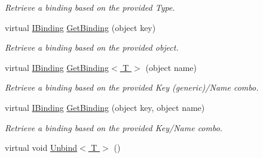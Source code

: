 \begin{DoxyCompactItemize}
\begin{DoxyCompactList}\small\item\em Retrieve a binding based on the provided Type. \end{DoxyCompactList}\item 
\hypertarget{classstrange_1_1framework_1_1impl_1_1_binder_a18a6e363f84b590c2660ba320e5563b9}{virtual \hyperlink{interfacestrange_1_1framework_1_1api_1_1_i_binding}{I\-Binding} \hyperlink{classstrange_1_1framework_1_1impl_1_1_binder_a18a6e363f84b590c2660ba320e5563b9}{Get\-Binding} (object key)}\label{classstrange_1_1framework_1_1impl_1_1_binder_a18a6e363f84b590c2660ba320e5563b9}

\begin{DoxyCompactList}\small\item\em Retrieve a binding based on the provided object. \end{DoxyCompactList}\item 
\hypertarget{classstrange_1_1framework_1_1impl_1_1_binder_ae134862dc94a741d870652d849705f46}{virtual \hyperlink{interfacestrange_1_1framework_1_1api_1_1_i_binding}{I\-Binding} \hyperlink{classstrange_1_1framework_1_1impl_1_1_binder_ae134862dc94a741d870652d849705f46}{Get\-Binding$<$ T $>$} (object name)}\label{classstrange_1_1framework_1_1impl_1_1_binder_ae134862dc94a741d870652d849705f46}

\begin{DoxyCompactList}\small\item\em Retrieve a binding based on the provided Key (generic)/\-Name combo. \end{DoxyCompactList}\item 
\hypertarget{classstrange_1_1framework_1_1impl_1_1_binder_ac45a17044d65c5143987c8b0a5e0f139}{virtual \hyperlink{interfacestrange_1_1framework_1_1api_1_1_i_binding}{I\-Binding} \hyperlink{classstrange_1_1framework_1_1impl_1_1_binder_ac45a17044d65c5143987c8b0a5e0f139}{Get\-Binding} (object key, object name)}\label{classstrange_1_1framework_1_1impl_1_1_binder_ac45a17044d65c5143987c8b0a5e0f139}

\begin{DoxyCompactList}\small\item\em Retrieve a binding based on the provided Key/\-Name combo. \end{DoxyCompactList}\item 
\hypertarget{classstrange_1_1framework_1_1impl_1_1_binder_a3c385fdd591d1decb1334b7cdee0237a}{virtual void \hyperlink{classstrange_1_1framework_1_1impl_1_1_binder_a3c385fdd591d1decb1334b7cdee0237a}{Unbind$<$ T $>$} ()}\label{classstrange_1_1framework_1_1impl_1_1_binder_a3c385fdd591d1decb1334b7cdee0237a}


\end{DoxyCompactItemize}
